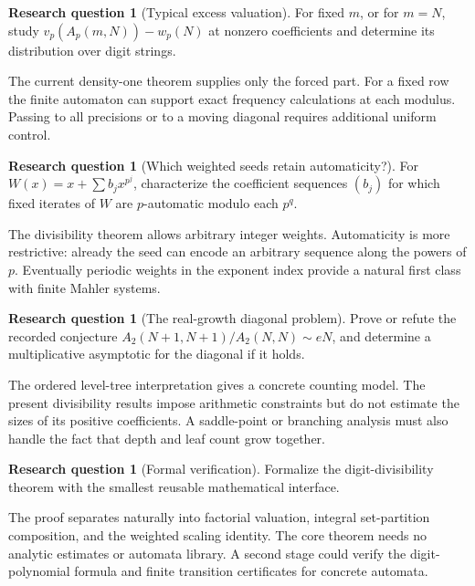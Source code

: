 \documentclass[11pt]{article}
\theoremstyle{definition}
\newtheorem{question}[theorem]{Research question}
\theoremstyle{remark}
\begin{document}
\begin{question}[Typical excess valuation]
\label{lim:dsd:q:excess}
For fixed $m$, or for $m=N$, study
$v_p(A_p(m,N))-w_p(N)$ at nonzero coefficients and determine
its distribution over digit strings.
\end{question}
The current density-one theorem supplies only the forced part.
For a fixed row the finite automaton can support exact frequency
calculations at each modulus. Passing to all precisions or to a
moving diagonal requires additional uniform control.

\begin{question}[Which weighted seeds retain automaticity?]
\label{lim:dsd:q:weighted-auto}
For $W(x)=x+\sum b_jx^{p^j}$, characterize the coefficient
sequences $(b_j)$ for which fixed iterates of $W$ are
$p$-automatic modulo each $p^q$.
\end{question}
The divisibility theorem allows arbitrary integer weights.
Automaticity is more restrictive: already the seed can encode
an arbitrary sequence along the powers of $p$. Eventually
periodic weights in the exponent index provide a natural first
class with finite Mahler systems.

\begin{question}[The real-growth diagonal problem]
\label{lim:dsd:q:ratio}
Prove or refute the recorded conjecture
$A_2(N+1,N+1)/A_2(N,N)\sim eN$, and determine a multiplicative
asymptotic for the diagonal if it holds.
\end{question}
The ordered level-tree interpretation gives a concrete counting
model. The present divisibility results impose arithmetic
constraints but do not estimate the sizes of its positive
coefficients. A saddle-point or branching analysis must also
handle the fact that depth and leaf count grow together.

\begin{question}[Formal verification]
\label{lim:dsd:q:formal}
Formalize the digit-divisibility theorem with the smallest
reusable mathematical interface.
\end{question}
The proof separates naturally into factorial valuation, integral
set-partition composition, and the weighted scaling identity.
The core theorem needs no analytic estimates or automata library.
A second stage could verify the digit-polynomial formula and
finite transition certificates for concrete automata.
\end{document}
